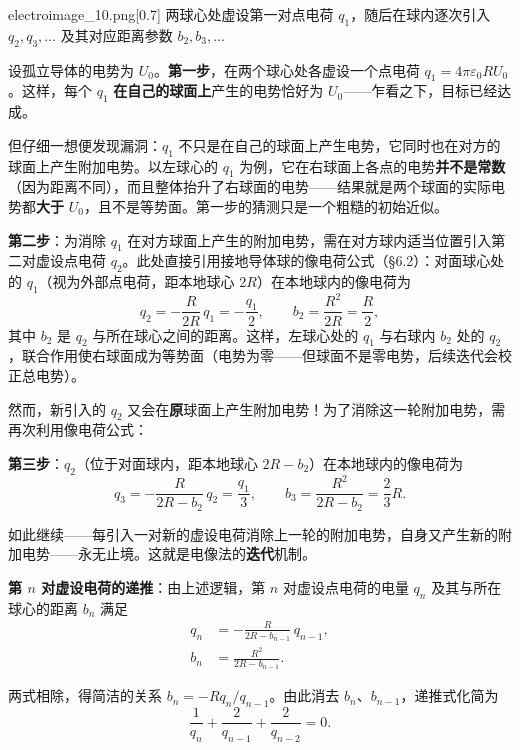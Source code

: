 \begin{so}[两个接触导体球的电容]
    \begin{singlefigure}[两个接触导体球的镜像法迭代]{electroimage_10.png}[0.7]
        两球心处虚设第一对点电荷 $q_1$，随后在球内逐次引入 $q_2, q_3, \ldots$ 及其对应距离参数 $b_2, b_3, \ldots$
    \end{singlefigure}

    设孤立导体的电势为 $U_0$。\textbf{第一步}，在两个球心处各虚设一个点电荷 $q_1 = 4\pi\varepsilon_0 R U_0$。这样，每个 $q_1$ \textbf{在自己的球面上}产生的电势恰好为 $U_0$——乍看之下，目标已经达成。

    但仔细一想便发现漏洞：$q_1$ 不只是在自己的球面上产生电势，它同时也在对方的球面上产生附加电势。以左球心的 $q_1$ 为例，它在右球面上各点的电势\textbf{并不是常数}（因为距离不同），而且整体抬升了右球面的电势——结果就是两个球面的实际电势都\textbf{大于} $U_0$，且不是等势面。第一步的猜测只是一个粗糙的初始近似。

    \textbf{第二步}：为消除 $q_1$ 在对方球面上产生的附加电势，需在对方球内适当位置引入第二对虚设点电荷 $q_2$。此处直接引用接地导体球的像电荷公式（§6.2）：对面球心处的 $q_1$（视为外部点电荷，距本地球心 $2R$）在本地球内的像电荷为
    \[
        q_2 = -\frac{R}{2R}\, q_1 = -\frac{q_1}{2}, \qquad
        b_2 = \frac{R^2}{2R} = \frac{R}{2},
    \]
    其中 $b_2$ 是 $q_2$ 与所在球心之间的距离。这样，左球心处的 $q_1$ 与右球内 $b_2$ 处的 $q_2$，联合作用使右球面成为等势面（电势为零——但球面不是零电势，后续迭代会校正总电势）。

    然而，新引入的 $q_2$ 又会在\textbf{原}球面上产生附加电势！为了消除这一轮附加电势，需再次利用像电荷公式：

    \textbf{第三步}：$q_2$（位于对面球内，距本地球心 $2R - b_2$）在本地球内的像电荷为
    \[
        q_3 = -\frac{R}{2R - b_2}\, q_2 = \frac{q_1}{3}, \qquad
        b_3 = \frac{R^2}{2R - b_2} = \frac{2}{3}R.
    \]

    如此继续——每引入一对新的虚设电荷消除上一轮的附加电势，自身又产生新的附加电势——永无止境。这就是电像法的\textbf{迭代}机制。

    \textbf{第 $n$ 对虚设电荷的递推}：由上述逻辑，第 $n$ 对虚设点电荷的电量 $q_n$ 及其与所在球心的距离 $b_n$ 满足
    \begin{align}
        q_n & = -\frac{R}{2R - b_{n-1}}\, q_{n-1}, \\
        b_n & = \frac{R^2}{2R - b_{n-1}}.
    \end{align}

    两式相除，得简洁的关系 $b_n = -R q_n / q_{n-1}$。由此消去 $b_n$、$b_{n-1}$，递推式化简为
    \[
        \frac{1}{q_n} + \frac{2}{q_{n-1}} + \frac{2}{q_{n-2}} = 0.
    \]


\end{so}
